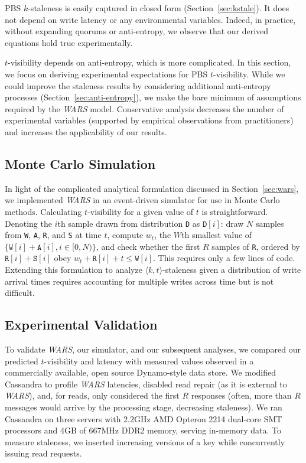 \documentclass{vldb}
\newcommand{\subsectionskip}{-0em}
\begin{document}
PBS $k$-staleness is easily captured in closed form
(Section~\ref{sec:kstale}).  It does not depend on write latency or
any environmental variables.  Indeed, in practice, without expanding
quorums or anti-entropy, we observe that our derived equations hold
true experimentally.

$t$-visibility depends on anti-entropy, which is more
complicated.  In this section, we focus on deriving experimental
expectations for PBS $t$-visibility.  While we could improve the
staleness results by considering additional anti-entropy processes
(Section~\ref{sec:anti-entropy}), we make the bare minimum of
assumptions required by the \textit{WARS} model.  Conservative
analysis decreases the number of experimental variables (supported by
empirical observations from practitioners) and increases the
applicability of our results.

\vspace{\subsectionskip}\subsection{Monte Carlo Simulation}
\label{sec:mcsim}

In light of the complicated analytical formulation discussed in
Section~\ref{sec:wars}, we implemented \textit{WARS} in an
event-driven simulator for use in Monte Carlo methods.  Calculating
$t$-visibility for a given value of $t$ is straightforward. Denoting the
$i$th sample drawn from distribution \texttt{D} as $\texttt{D}[i]$:
draw $N$ samples from \texttt{W}, \texttt{A}, \texttt{R}, and
\texttt{S} at time $t$, compute $w_t$, the $W$th smallest value of $\{\texttt{W}[i]+\texttt{A}[i], i \in [0, N)\}$, and check whether the first
$R$ samples of \texttt{R}, ordered by $\texttt{R}[i]+\texttt{S}[i]$
obey $w_t+\texttt{R}[i] + t\leq \texttt{W}[i]$.  This requires only a
few lines of code.  Extending this formulation to analyze $\langle k,
t \rangle$-staleness given a distribution of write arrival times
requires accounting for multiple writes across time but is not
difficult.

\subsection{Experimental Validation}

To validate \textit{WARS}, our simulator, and our subsequent analyses,
we compared our predicted $t$-visibility and latency with measured
values observed in a commercially available, open source Dynamo-style
data store.  We modified Cassandra to profile \textit{WARS} latencies,
disabled read repair (as it is external to \textit{WARS}), and, for
reads, only considered the first $R$ responses (often, more than $R$
messages would arrive by the processing stage, decreasing staleness).
We ran Cassandra on three servers with 2.2GHz AMD Opteron 2214
dual-core SMT processors and 4GB of 667MHz DDR2 memory, serving
in-memory data.  To measure staleness, we inserted increasing versions of a key while concurrently issuing read requests.
\end{document}
